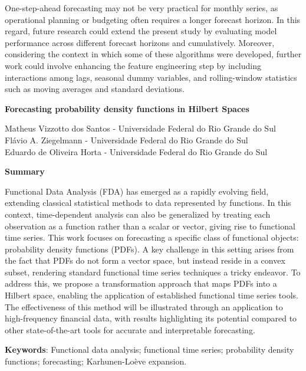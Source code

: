 One-step-ahead forecasting may not be very practical for monthly series, as operational planning or budgeting often requires a longer forecast horizon. In this regard, future research could extend the present study by evaluating model performance across different forecast horizons and cumulatively. Moreover, considering the context in which some of these algorithms were developed, further work could involve enhancing the feature engineering step by including interactions among lags, seasonal dummy variables, and rolling-window statistics such as moving averages and standard deviations.






\newpage    

\begin{center}
\Large{\textbf{Forecasting probability density functions in Hilbert Spaces}}
\end{center}

\begin{center}
    Matheus Vizzotto dos Santos - Universidade Federal do Rio Grande do Sul	\\
    Flávio A. Ziegelmann - Universidade Federal do Rio Grande do Sul \\
    Eduardo de Oliveira Horta - Universidade Federal do Rio Grande do Sul
    
    \vspace{0.5cm}
    \large{\textbf{Summary}}
\end{center}

Functional Data Analysis (FDA) has emerged as a rapidly evolving field, extending classical statistical methods to data represented by functions. In this context, time-dependent analysis can also be generalized by treating each observation as a function rather than a scalar or vector, giving rise to functional time series. This work focuses on forecasting a specific class of functional objects: probability density functions (PDFs). A key challenge in this setting arises from the fact that PDFs do not form a vector space, but instead reside in a convex subset, rendering standard functional time series techniques a tricky endeavor. To address this, we propose a transformation approach that maps PDFs into a Hilbert space, enabling the application of established functional time series tools. The effectiveness of this method will be illustrated through an application to high-frequency financial data, with results highlighting its potential compared to other state-of-the-art tools for accurate and interpretable forecasting.

\vspace{0.5cm}
\textbf{Keywords}: Functional data analysis; functional time series; probability density functions; forecasting; Karhunen-Loève expansion. 


